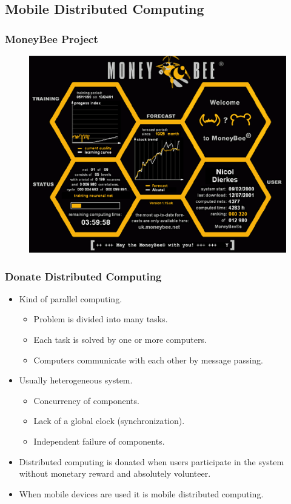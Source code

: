 \documentclass{beamer}
\begin{document}
\subsection{Mobile Distributed Computing}

\begin{frame}
\frametitle{MoneyBee Project}
\begin{figure}[h]
  \centering
  \includegraphics[width=0.75\linewidth]{fig05}
\label{fig:05}
\end{figure}
\end{frame}

\begin{frame}
\frametitle{Donate Distributed Computing}
\begin{itemize}
  \item Kind of parallel computing.
  \begin{itemize}
    \item Problem is divided into many tasks.
    \item Each task is solved by one or more computers.
    \item Computers communicate with each other by message passing.
  \end{itemize}
  \item Usually heterogeneous system.
  \begin{itemize}
    \item Concurrency of components.
    \item Lack of a global clock (synchronization).
    \item Independent failure of components.
  \end{itemize}
  \item Distributed computing is donated when users participate in the system without monetary reward and absolutely volunteer.
  \item When mobile devices are used it is mobile distributed computing.
\end{itemize}
\end{frame}
\end{document}
